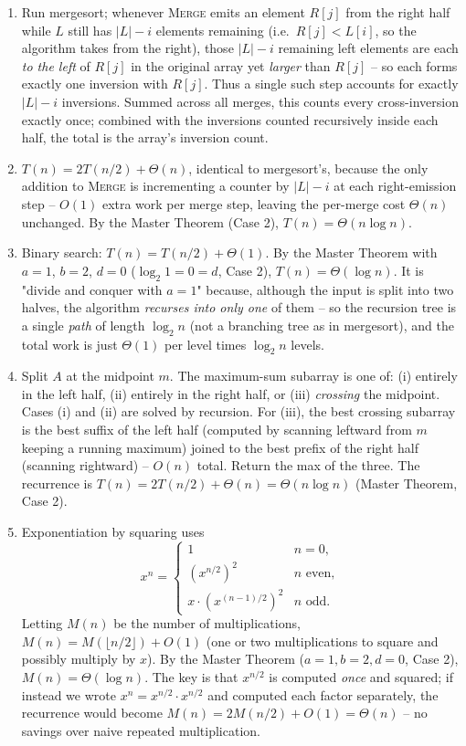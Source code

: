 \documentclass[11pt]{article}
\begin{document}
\begin{enumerate}[label=\textbf{A\arabic*.}, leftmargin=2.2em]
\item Run mergesort; whenever \textsc{Merge} emits an element $R[j]$ from the right half
while $L$ still has $|L| - i$ elements remaining (i.e.\ $R[j] < L[i]$, so the algorithm
takes from the right), those $|L| - i$ remaining left elements are each \emph{to the left}
of $R[j]$ in the original array yet \emph{larger} than $R[j]$ -- so each forms exactly one
inversion with $R[j]$. Thus a single such step accounts for exactly $|L| - i$ inversions.
Summed across all merges, this counts every cross-inversion exactly once; combined with the
inversions counted recursively inside each half, the total is the array's inversion count.

\item $T(n) = 2T(n/2) + \Theta(n)$, identical to mergesort's, because the only addition to
\textsc{Merge} is incrementing a counter by $|L| - i$ at each right-emission step -- $O(1)$
extra work per merge step, leaving the per-merge cost $\Theta(n)$ unchanged. By the Master
Theorem (Case 2), $T(n) = \Theta(n \log n)$.

\item Binary search: $T(n) = T(n/2) + \Theta(1)$. By the Master Theorem with $a=1$, $b=2$,
$d=0$ ($\log_2 1 = 0 = d$, Case 2), $T(n) = \Theta(\log n)$. It is "divide and conquer with
$a=1$" because, although the input is split into two halves, the algorithm \emph{recurses
into only one} of them -- so the recursion tree is a single \emph{path} of length $\log_2 n$
(not a branching tree as in mergesort), and the total work is just $\Theta(1)$ per level
times $\log_2 n$ levels.

\item Split $A$ at the midpoint $m$. The maximum-sum subarray is one of: (i) entirely in the
left half, (ii) entirely in the right half, or (iii) \emph{crossing} the midpoint. Cases (i)
and (ii) are solved by recursion. For (iii), the best crossing subarray is the best suffix
of the left half (computed by scanning leftward from $m$ keeping a running maximum) joined to
the best prefix of the right half (scanning rightward) -- $O(n)$ total. Return the max of the
three. The recurrence is $T(n) = 2T(n/2) + \Theta(n) = \Theta(n \log n)$ (Master Theorem,
Case 2).

\item Exponentiation by squaring uses
\[
    x^n = \begin{cases} 1 & n=0,\\ (x^{n/2})^2 & n \text{ even},\\ x\cdot(x^{(n-1)/2})^2 & n \text{ odd}.\end{cases}
\]
Letting $M(n)$ be the number of multiplications, $M(n) = M(\lfloor n/2 \rfloor) + O(1)$
(one or two multiplications to square and possibly multiply by $x$). By the Master Theorem
($a=1,b=2,d=0$, Case 2), $M(n) = \Theta(\log n)$. The key is that $x^{n/2}$ is computed
\emph{once} and squared; if instead we wrote $x^n = x^{n/2}\cdot x^{n/2}$ and computed each
factor separately, the recurrence would become $M(n) = 2M(n/2) + O(1) = \Theta(n)$ -- no
savings over naive repeated multiplication.


\end{enumerate}
\end{document}

